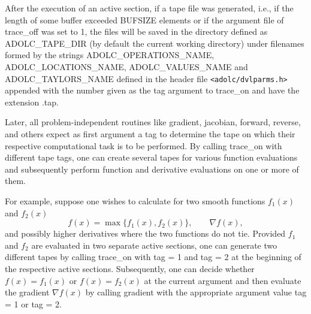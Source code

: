 \documentclass[11pt,twoside]{article}
\begin{document}
After the execution of an active section, if a tape file was generated, i.e.,
if the length of some buffer exceeded {\sf [OLVT]BUFSIZE} elements or if the 
argument {\sf file} of {\sf trace\_off} was set to 1, the files will be
saved in the directory defined as {\sf ADOLC\_TAPE\_DIR} (by default
the current working directory) under filenames formed by 
the strings {\sf ADOLC\_OPERATIONS\_NAME}, {\sf
  ADOLC\_LOCATIONS\_NAME}, {\sf ADOLC\_VALUES\_NAME} and {\sf
  ADOLC\_TAYLORS\_NAME} defined in
the header file \verb=<adolc/dvlparms.h>= appended with the number
given as the {\sf tag} argument to {\sf trace\_on} and have the
extension {\sf .tap}.

 Later, all problem-independent routines
like {\sf gradient}, {\sf jacobian}, {\sf forward}, {\sf reverse}, and others
expect as first argument a {\sf tag} to determine
the tape on which their respective computational task is to be performed.
By calling {\sf trace\_on} with different tape {\sf tag}s, one can create
several tapes for various function evaluations and subsequently perform
function and derivative evaluations on one or more of them. 

For example, suppose one wishes to calculate for two smooth functions 
$f_1(x)$ and $f_2(x)$ 
\[
   f(x) = \max \{f_1(x) ,f_2(x)\},\qquad \nabla f(x),
\]
and possibly higher derivatives where the two functions do not tie.
Provided $f_1$ and $f_2$ are evaluated in two separate active sections,
one can generate two different tapes by calling {\sf trace\_on} with
{\sf tag} = 1 and {\sf tag} = 2 at the beginning of the respective active
sections.
Subsequently, one can decide whether $f(x)=f_1(x)$ or $f(x)=f_2(x)$ at the 
current argument and then evaluate the gradient $\nabla f(x)$ by calling
{\sf gradient} with the appropriate argument value {\sf tag} = 1 or
{\sf tag} = 2. 
%
\end{document}
